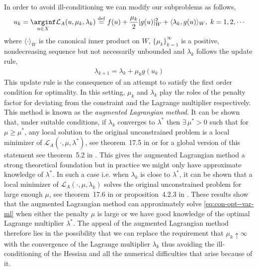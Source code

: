 In order to avoid ill-conditioning we can modify our subproblems as follows,
\begin{align}
    u_k=\underset{u\in X}\arginf\mathcal L_A(u, \mu_k, \lambda_k)\stackrel{\rm def}{=} f(u) + \frac{\mu_k}{2}|g(u)|_W^2 + \langle\lambda_k, g(u)\rangle_W,\;k=1,2,\cdots\label{eq:seq-uncon-al--var-ml}
\end{align}
where $\langle\cdot\rangle_W$ is the canonical inner product on $W$, $\{\mu_k\}_{k=1}^\infty$ is a positive, nondecreasing sequence but not necessarily unbounded and $\lambda_k$ follows the update rule,
\begin{align}
    \lambda_{k+1} = \lambda_k + \mu_k g(u_k)\label{eq:mul-update--var-ml}
\end{align}
This update rule is the consequence of an attempt to satisfy the first order condition for optimality. In this setting, $\mu_k$ and $\lambda_k$ play the roles of the penalty factor for deviating from the constraint and the Lagrange multiplier respectively. This method is known as the \textit{augmented Lagrangian method}. It can be shown that, under suitable conditions, if $\lambda_k$ converges to $\lambda^*$ then $\exists \,\mu^*>0$ such that for $\mu\ge\mu^*$, any local solution to the original unconstrained problem is a local minimizer of $\mathcal L_A(\cdot, \mu, \lambda^*)$, see theorem~17.5 in \cite{jorge2006numerical} or for a global version of this statement see theorem~5.2 in \cite{birgin2014practical}. This gives the augmented Lagrangian method a strong theoretical foundation but in practice we might only have approximate knowledge of $\lambda^*$. In such a case i.e. when $\lambda_k$ is close to $\lambda^*$, it can be shown that a local minimizer of $\mathcal L_A(\cdot, \mu, \lambda_k)$ solves the original unconstrained problem for large enough $\mu$, see theorem~17.6 in \cite{jorge2006numerical} or proposition~4.2.3 in \cite{bertsekas1995athena}. These results show that the augmented Lagrangian method can approximately solve \eqref{eq:con-opt--var-ml} when either the penalty $\mu$ is large or we have good knowledge of the optimal Lagrange multiplier $\lambda^*$. The appeal of the augmented Lagrangian method therefore lies in the possibility that we can replace the requirement that $\mu_k\uparrow\infty$ with the convergence of the Lagrange multiplier $\lambda_k$ thus avoiding the ill-conditioning of the Hessian and all the numerical difficulties that arise because of it. 



